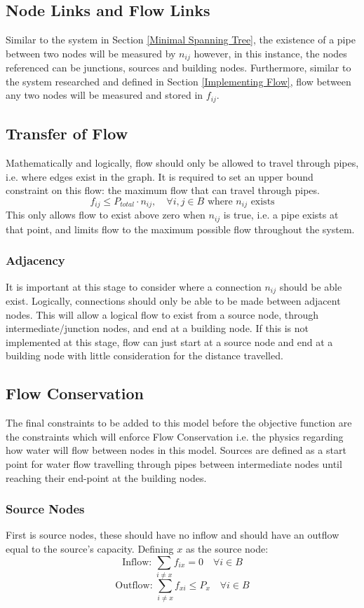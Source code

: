 \subsection{Node Links and Flow Links}\label{nodeandflowlinks}
Similar to the system in Section \ref{Minimal Spanning Tree}, the existence of a pipe between two nodes will be measured by $n_{ij}$ however, in this instance, the nodes referenced can be junctions, sources and building nodes. Furthermore, similar to the system researched and defined in Section \ref{Implementing Flow}, flow between any two nodes will be measured and stored in $f_{ij}$.
\subsection{Transfer of Flow}\label{flowonexistingedge}
Mathematically and logically, flow should only be allowed to travel through pipes, i.e. where edges exist in the graph. It is required to set an upper bound constraint on this flow: the maximum flow that can travel through pipes.
\[
f_{ij}\leq P_{total}\cdot n_{ij}, \quad\forall i,j \in B \text{ where $n_{ij}$ exists}
\]
This only allows flow to exist above zero when $n_{ij}$ is true, i.e. a pipe exists at that point, and limits flow to the maximum possible flow throughout the system.
\subsubsection{Adjacency}
It is important at this stage to consider where a connection $n_{ij}$ should be able exist. Logically, connections should only be able to be made between adjacent nodes. This will allow a logical flow to exist from a source node, through intermediate/junction nodes, and end at a building node. If this is not implemented at this stage, flow can just start at a source node and end at a building node with little consideration for the distance travelled.

\subsection{Flow Conservation}\label{flowconservation}
The final constraints to be added to this model before the objective function are the constraints which will enforce Flow Conservation i.e. the physics regarding how water will flow between nodes in this model. Sources are defined as a start point for water flow travelling through pipes between intermediate nodes until reaching their end-point at the building nodes.
\subsubsection{Source Nodes}
First is source nodes, these should have no inflow and should have an outflow equal to the source's capacity.\newline
Defining $x$ as the source node:
\[
\text{Inflow: }\sum_{i\neq x}f_{ix} = 0 \quad \forall i\in B
\]
\[
\text{Outflow: }\sum_{i\neq x}f_{xi}\leq P_x \quad \forall i\in B
\]
